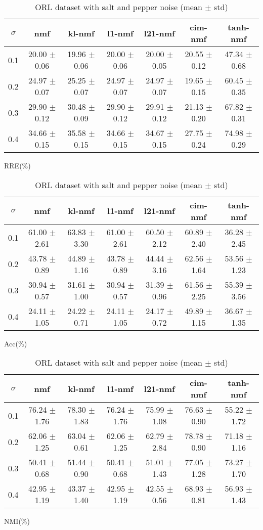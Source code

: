 \documentclass{article} %
\begin{document}
\begin{table}
\begin{subtable}{\linewidth}
\begin{tabular}{c|cccccc}$\sigma$ & nmf & kl-nmf & l1-nmf & l21-nmf & cim-nmf & tanh-nmf \\\hline
0.1 & 20.00 $\pm$ 0.06 & 19.96 $\pm$ 0.06 & 20.00 $\pm$ 0.06 & 20.00 $\pm$ 0.05 & 20.55 $\pm$ 0.12 & 47.34 $\pm$ 0.68 \\
0.2 & 24.97 $\pm$ 0.07 & 25.25 $\pm$ 0.07 & 24.97 $\pm$ 0.07 & 24.97 $\pm$ 0.07 & 19.65 $\pm$ 0.15 & 60.45 $\pm$ 0.35 \\
0.3 & 29.90 $\pm$ 0.12 & 30.48 $\pm$ 0.09 & 29.90 $\pm$ 0.12 & 29.91 $\pm$ 0.12 & 21.13 $\pm$ 0.20 & 67.82 $\pm$ 0.31 \\
0.4 & 34.66 $\pm$ 0.15 & 35.58 $\pm$ 0.15 & 34.66 $\pm$ 0.15 & 34.67 $\pm$ 0.15 & 27.75 $\pm$ 0.24 & 74.98 $\pm$ 0.29 \\
\end{tabular}\caption{RRE(\%)}\end{subtable}
\begin{subtable}{\linewidth}
\begin{tabular}{c|cccccc}$\sigma$ & nmf & kl-nmf & l1-nmf & l21-nmf & cim-nmf & tanh-nmf \\\hline
0.1 & 61.00 $\pm$ 2.61 & 63.83 $\pm$ 3.30 & 61.00 $\pm$ 2.61 & 60.50 $\pm$ 2.12 & 60.89 $\pm$ 2.40 & 36.28 $\pm$ 2.45 \\
0.2 & 43.78 $\pm$ 0.89 & 44.89 $\pm$ 1.16 & 43.78 $\pm$ 0.89 & 44.44 $\pm$ 3.16 & 62.56 $\pm$ 1.64 & 53.56 $\pm$ 1.23 \\
0.3 & 30.94 $\pm$ 0.57 & 31.61 $\pm$ 1.00 & 30.94 $\pm$ 0.57 & 31.39 $\pm$ 0.96 & 61.56 $\pm$ 2.25 & 55.39 $\pm$ 3.56 \\
0.4 & 24.11 $\pm$ 1.05 & 24.22 $\pm$ 0.71 & 24.11 $\pm$ 1.05 & 24.17 $\pm$ 0.72 & 49.89 $\pm$ 1.15 & 36.67 $\pm$ 1.35 \\
\end{tabular}\caption{Acc(\%)}\end{subtable}
\begin{subtable}{\linewidth}
\begin{tabular}{c|cccccc}$\sigma$ & nmf & kl-nmf & l1-nmf & l21-nmf & cim-nmf & tanh-nmf \\\hline
0.1 & 76.24 $\pm$ 1.76 & 78.30 $\pm$ 1.83 & 76.24 $\pm$ 1.76 & 75.99 $\pm$ 1.08 & 76.63 $\pm$ 0.90 & 55.22 $\pm$ 1.72 \\
0.2 & 62.06 $\pm$ 1.25 & 63.04 $\pm$ 0.61 & 62.06 $\pm$ 1.25 & 62.79 $\pm$ 2.84 & 78.78 $\pm$ 0.90 & 71.18 $\pm$ 1.16 \\
0.3 & 50.41 $\pm$ 0.68 & 51.44 $\pm$ 0.90 & 50.41 $\pm$ 0.68 & 51.01 $\pm$ 1.43 & 77.05 $\pm$ 1.28 & 73.27 $\pm$ 1.70 \\
0.4 & 42.95 $\pm$ 1.19 & 43.37 $\pm$ 1.40 & 42.95 $\pm$ 1.19 & 42.55 $\pm$ 0.56 & 68.93 $\pm$ 0.81 & 56.93 $\pm$ 1.43 \\
\end{tabular}\caption{NMI(\%)}\end{subtable}
\caption{ORL dataset with salt and pepper noise (mean $\pm$ std)}
\end{table}
\end{document}
